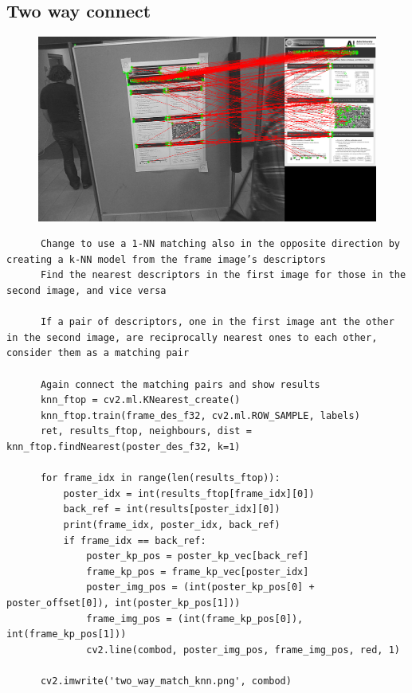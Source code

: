 \documentclass{article}
\begin{document}
\subsection{Two way connect}
  \begin{figure}[h]
      \centering
      \includegraphics[scale=0.35]{two_way_match_knn}
  \end{figure}

  \begin{verbatim}
      Change to use a 1-NN matching also in the opposite direction by creating a k-NN model from the frame image’s descriptors
      Find the nearest descriptors in the first image for those in the second image, and vice versa

      If a pair of descriptors, one in the first image ant the other in the second image, are reciprocally nearest ones to each other, consider them as a matching pair

      Again connect the matching pairs and show results
      knn_ftop = cv2.ml.KNearest_create()
      knn_ftop.train(frame_des_f32, cv2.ml.ROW_SAMPLE, labels)
      ret, results_ftop, neighbours, dist = knn_ftop.findNearest(poster_des_f32, k=1)

      for frame_idx in range(len(results_ftop)):
          poster_idx = int(results_ftop[frame_idx][0])
          back_ref = int(results[poster_idx][0])
          print(frame_idx, poster_idx, back_ref)
          if frame_idx == back_ref:
              poster_kp_pos = poster_kp_vec[back_ref]
              frame_kp_pos = frame_kp_vec[poster_idx]
              poster_img_pos = (int(poster_kp_pos[0] + poster_offset[0]), int(poster_kp_pos[1]))
              frame_img_pos = (int(frame_kp_pos[0]), int(frame_kp_pos[1]))
              cv2.line(combod, poster_img_pos, frame_img_pos, red, 1)

      cv2.imwrite('two_way_match_knn.png', combod)
  \end{verbatim}
\end{document}
